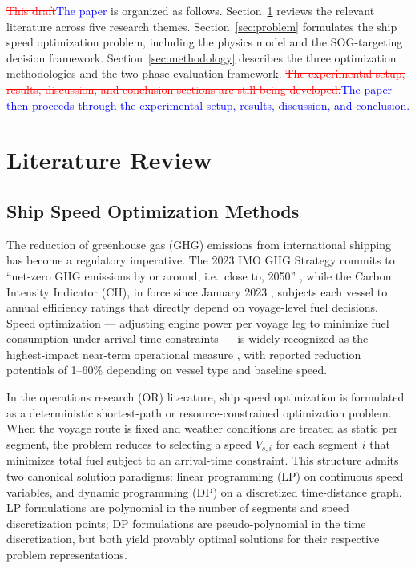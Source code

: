 \documentclass[review,authoryear]{elsarticle}  %
\newcommand{\revadd}[1]{\textcolor{blue}{#1}}
\newcommand{\revdel}[1]{\textcolor{red}{\sout{#1}}}
\begin{document}
\revdel{This draft}\revadd{The paper} is organized as follows. Section~\ref{sec:literature} reviews the relevant literature across five research themes. Section~\ref{sec:problem} formulates the ship speed optimization problem, including the physics model and the SOG-targeting decision framework. Section~\ref{sec:methodology} describes the three optimization methodologies and the two-phase evaluation framework. \revdel{The experimental setup, results, discussion, and conclusion sections are still being developed.}\revadd{The paper then proceeds through the experimental setup, results, discussion, and conclusion.}


\section{Literature Review}
\label{sec:literature}

\subsection{Ship Speed Optimization Methods}
\label{sec:lit-methods}

The reduction of greenhouse gas (GHG) emissions from international shipping has become a regulatory imperative. The 2023 IMO GHG Strategy commits to ``net-zero GHG emissions by or around, i.e.\ close to, 2050'' \citet{IMO2023}, while the Carbon Intensity Indicator (CII), in force since January 2023 \citet{Tadros2023}, subjects each vessel to annual efficiency ratings that directly depend on voyage-level fuel decisions. Speed optimization --- adjusting engine power per voyage leg to minimize fuel consumption under arrival-time constraints --- is widely recognized as the highest-impact near-term operational measure \citet{Bouman2017}, with reported reduction potentials of 1--60\% depending on vessel type and baseline speed.

In the operations research (OR) literature, ship speed optimization is formulated as a deterministic shortest-path or resource-constrained optimization problem. When the voyage route is fixed and weather conditions are treated as static per segment, the problem reduces to selecting a speed $V_{s,i}$ for each segment $i$ that minimizes total fuel subject to an arrival-time constraint. This structure admits two canonical solution paradigms: linear programming (LP) on continuous speed variables, and dynamic programming (DP) on a discretized time-distance graph. LP formulations are polynomial in the number of segments and speed discretization points; DP formulations are pseudo-polynomial in the time discretization, but both yield provably optimal solutions for their respective problem representations.
\end{document}
